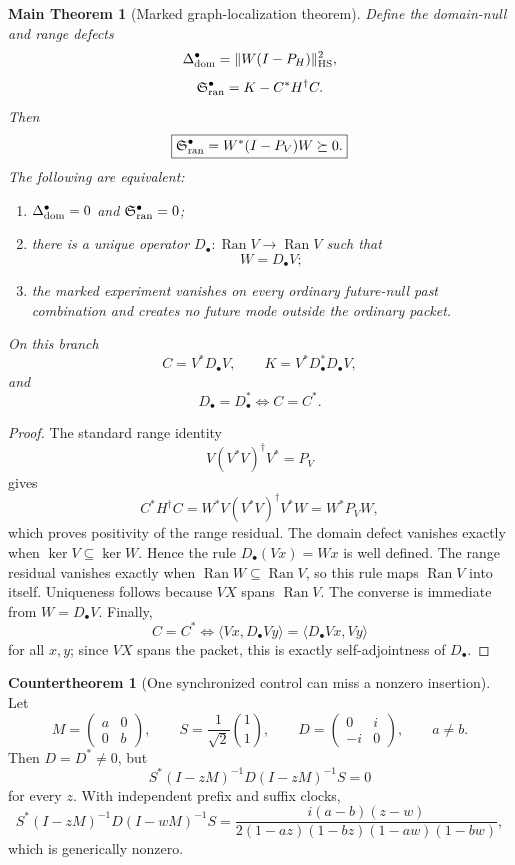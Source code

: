 \documentclass[11pt,oneside,openany]{book}
\numberwithin{equation}{chapter}
\newtheorem{maintheorem}[theorem]{Main Theorem}
\theoremstyle{definition}
\newtheorem{countertheorem}[theorem]{Countertheorem}
\theoremstyle{remark}
\newcommand{\Ran}{\operatorname{Ran}}
\newcommand{\HS}{\mathrm{HS}}
\newcommand{\norm}[1]{\lVert #1\rVert}
\begin{document}
\begin{maintheorem}[Marked graph-localization theorem]
\label{thm:v6-marked-graph-localization}
Define the domain-null and range defects
\[
 \Delta_{\rm dom}^{\bullet}
 =\norm{W(I-P_H)}_{\HS}^2,
\]
\[
 \mathfrak S_{\rm ran}^{\bullet}
 =K-C^*H^\dagger C.
\]
Then
\[
 \boxed{
 \mathfrak S_{\rm ran}^{\bullet}
 =W^*(I-P_V)W\succeq0.}
\]
The following are equivalent:
\begin{enumerate}[label=\textup{(\roman*)},leftmargin=2.8em]
\item \(\Delta_{\rm dom}^{\bullet}=0\) and
      \(\mathfrak S_{\rm ran}^{\bullet}=0\);
\item there is a unique operator
      \(D_\bullet:\Ran V\to\Ran V\) such that
      \[
       \boxed{W=D_\bullet V;}
      \]
\item the marked experiment vanishes on every ordinary future-null past
      combination and creates no future mode outside the ordinary packet.
\end{enumerate}
On this branch
\[
 C=V^*D_\bullet V,
 \qquad
 K=V^*D_\bullet^*D_\bullet V,
\]
and
\[
 \boxed{D_\bullet=D_\bullet^*\iff C=C^*.}
\]
\end{maintheorem}

\begin{proof}
The standard range identity
\[
 V(V^*V)^\dagger V^*=P_V
\]
gives
\[
 C^*H^\dagger C
 =W^*V(V^*V)^\dagger V^*W
 =W^*P_VW,
\]
which proves positivity of the range residual.  The domain defect vanishes
exactly when \(\ker V\subseteq\ker W\).  Hence the rule
\(D_\bullet(Vx)=Wx\) is well defined.  The range residual vanishes exactly
when \(\Ran W\subseteq\Ran V\), so this rule maps \(\Ran V\) into itself.
Uniqueness follows because \(V X\) spans \(\Ran V\).  The converse is
immediate from \(W=D_\bullet V\).  Finally,
\[
 C=C^*
 \iff
 \langle Vx,D_\bullet Vy\rangle
 =\langle D_\bullet Vx,Vy\rangle
\]
for all \(x,y\); since \(VX\) spans the packet, this is exactly
self-adjointness of \(D_\bullet\).
\end{proof}

\begin{countertheorem}[One synchronized control can miss a nonzero insertion]
\label{cth:v6-two-clock-firewall}
Let
\[
 M=\begin{pmatrix}a&0\\0&b\end{pmatrix},
 \qquad
 S=\frac{1}{\sqrt2}\binom11,
 \qquad
 D=\begin{pmatrix}0&i\\-i&0\end{pmatrix},
 \qquad a\ne b.
\]
Then \(D=D^*\ne0\), but
\[
 \boxed{
 S^*(I-zM)^{-1}D(I-zM)^{-1}S=0
 }
\]
for every \(z\).  With independent prefix and suffix clocks,
\[
 \boxed{
 S^*(I-zM)^{-1}D(I-wM)^{-1}S
 =\frac{i(a-b)(z-w)}
 {2(1-az)(1-bz)(1-aw)(1-bw)},}
\]
which is generically nonzero.
\end{countertheorem}
\end{document}
